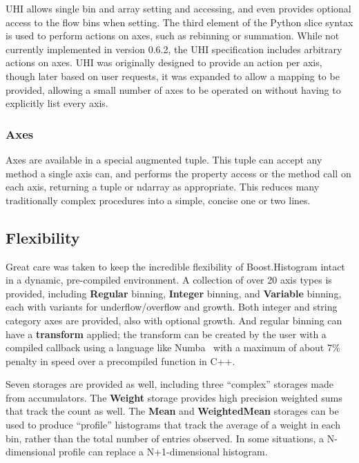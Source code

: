 \documentclass{webofc}
\begin{document}
UHI allows single bin and array setting and accessing, and even provides optional access to the flow bins when setting. The third element of the Python slice syntax is used to perform actions on axes, such as rebinning or summation. While not currently implemented in version 0.6.2, the UHI specification includes arbitrary actions on axes. UHI was originally designed to provide an action per axis, though later based on user requests, it was expanded to allow a mapping to be provided, allowing a small number of axes to be operated on without having to explicitly list every axis.

\subsubsection{Axes}
\label{sec-bhp-axes}

Axes are available in a special augmented tuple. This tuple can accept any method a single axis can, and performs the property access or the method call on each axis, returning a tuple or ndarray as appropriate. This reduces many traditionally complex procedures into a simple, concise one or two lines.

\subsection{Flexibility}

Great care was taken to keep the incredible flexibility of Boost.Histogram intact in a dynamic, pre-compiled environment. A collection of over 20 axis types is provided, including \textbf{Regular} binning, \textbf{Integer} binning, and \textbf{Variable} binning, each with variants for underflow/overflow and growth. Both integer and string category axes are provided, also with optional growth. And regular binning can have a \textbf{transform} applied; the transform can be created by the user with a compiled callback using a language like Numba~\cite{lam2015numba} with a maximum of about 7\% penalty in speed over a precompiled function in C++.

Seven storages are provided as well, including three ``complex'' storages made from accumulators. The \textbf{Weight} storage provides high precision weighted sums that track the count as well. The \textbf{Mean} and \textbf{WeightedMean} storages can be used to produce ``profile'' histograms that track the average of a weight in each bin, rather than the total number of entries observed. In some situations, a N-dimensional profile can replace a N+1-dimensional histogram.
\end{document}
